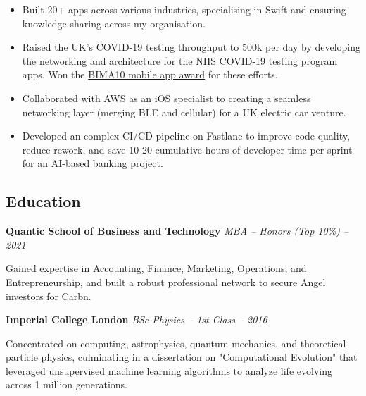 \documentclass[11pt, oneside]{article}
\begin{document}
\begin{itemize}
  \item Built 20+ apps across various industries, specialising in Swift and ensuring knowledge sharing across my organisation.
  \item Raised the UK's COVID-19 testing throughput to 500k per day by developing the networking and architecture for the NHS COVID-19 testing program apps. Won the \href{https://apps.apple.com/app/carbn/id1533681322}{BIMA10 mobile app award} for these efforts.
  \item Collaborated with AWS as an iOS specialist to creating a seamless networking layer (merging BLE and cellular) for a UK electric car venture.
  \item Developed an complex CI/CD pipeline on Fastlane to improve code quality, reduce rework, and save 10-20 cumulative hours of developer time per sprint for an AI-based banking project.
  
\end{itemize}

\medskip

\subsection*{Education}
\textbf{Quantic School of Business and Technology}
\hfill
\textit{MBA – Honors (Top 10\%) – 2021}

Gained expertise in Accounting, Finance, Marketing, Operations, and Entrepreneurship, and built a robust professional network to secure Angel investors for Carbn.

\medskip

\textbf{Imperial College London}
\hfill
\textit{BSc Physics – 1st Class – 2016}

Concentrated on computing, astrophysics, quantum mechanics, and theoretical particle physics, culminating in a dissertation on "Computational Evolution" that leveraged unsupervised machine learning algorithms to analyze life evolving across 1 million generations.
\end{document}
